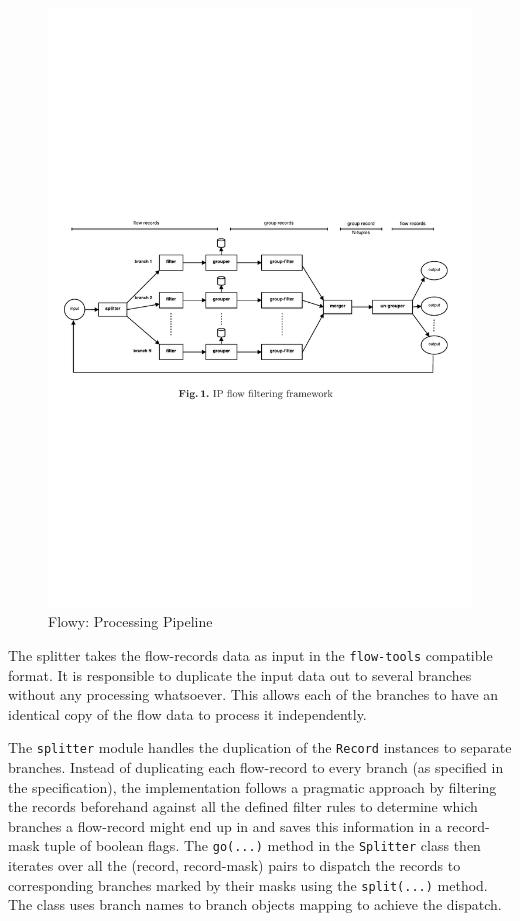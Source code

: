 \begin{figure}[h!]
\begin{center}
  \includegraphics* [width=1.0\linewidth]{figures/flowy-pipeline}
  \caption{Flowy: Processing Pipeline \cite{vmarinov:2009}}
  \label{fig:flowy-pipeline}
\end{center}
\end{figure}

The splitter takes the flow-records data as input in the \texttt{flow-tools}
compatible format. It is responsible to duplicate the input data out to
several  branches without any processing whatsoever. This
allows each of the branches to have an identical copy of the flow data to
process it independently.

The \texttt{splitter} module handles the duplication of the \texttt{Record}
instances to separate branches. Instead of duplicating each flow-record to
every branch (as specified in the specification), the implementation follows a
pragmatic approach by filtering the records beforehand against all the defined
 filter rules to determine which branches a
flow-record might end up in and saves this information in a record-mask tuple
of boolean flags. The \texttt{go(...)} method in the \texttt{Splitter} class
then iterates over all the (record, record-mask) pairs to dispatch the records
to corresponding branches marked by their masks using the \texttt{split(...)}
method. The class uses branch names to branch objects mapping to achieve the
dispatch.

